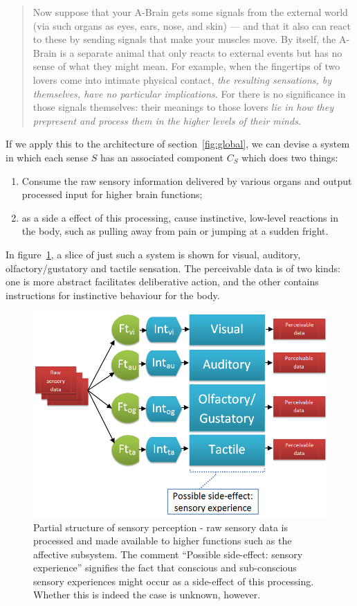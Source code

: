 \documentclass[]{scrartcl}
\begin{document}
\begin{quote}
	Now suppose that your A-Brain gets some signals from the external world (via such organs as eyes, ears, nose, and skin) --- and that it also can react to these by sending signals that make your muscles move. By itself, the A-Brain is a separate animal that only reacts to external events but has no sense of what they might mean. For example, when the fingertips of two lovers come into intimate physical contact, {\em the resulting sensations, by themselves, have no particular implications}. For there is no significance in those signals themselves: their meanings to those lovers {\em lie in how they prepresent and process them in the higher levels of their minds.}
\end{quote}

If we apply this to the architecture of section~\ref{fig:global}, we can devise a system in which each sense $S$ has an associated component $C_S$ which does two things:
\begin{enumerate}
	\item Consume the raw sensory information delivered by various organs and output processed input for higher brain functions;
	\item as a side a effect of this processing, cause  instinctive, low-level reactions in the body, such as pulling away from pain or jumping at a sudden fright.
\end{enumerate}

In figure~\ref{fig:sensoryPerception}, a slice of just such a system is shown for visual, auditory, olfactory/gustatory and tactile sensation. The perceivable data is of two kinds: one is more abstract facilitates deliberative action, and the other contains instructions for instinctive behaviour for the body.

\begin{figure}[!h]
	\centering
	\includegraphics[width=\textwidth]{figs/sensoryPerception.png}
	\caption{Partial structure of sensory perception - raw sensory data is processed and made available to higher functions such as the affective subsystem. The comment ``Possible side-effect: sensory experience'' signifies the fact that conscious and sub-conscious sensory experiences might occur as a side-effect of this processing. Whether this is indeed the case is unknown, however.}
	\label{fig:sensoryPerception}
\end{figure}
\end{document}
